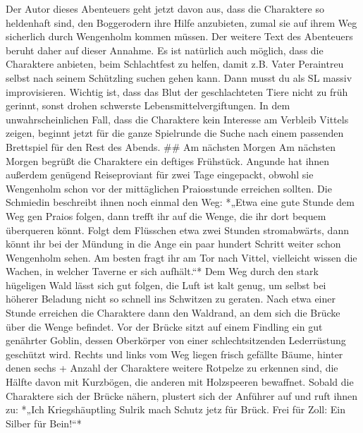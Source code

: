 Der Autor dieses Abenteuers geht jetzt davon aus, dass die Charaktere so heldenhaft sind, den Boggerodern ihre Hilfe anzubieten, zumal sie auf ihrem Weg sicherlich durch Wengenholm kommen müssen. Der weitere Text des Abenteuers beruht daher auf dieser Annahme. Es ist natürlich auch möglich, dass die Charaktere anbieten, beim Schlachtfest zu helfen, damit z.B. Vater Peraintreu selbst nach seinem Schützling suchen gehen kann. Dann musst du als SL massiv improvisieren. Wichtig ist, dass das Blut der geschlachteten Tiere nicht zu früh gerinnt, sonst drohen schwerste Lebensmittelvergiftungen.
In dem unwahrscheinlichen Fall, dass die Charaktere kein Interesse am Verbleib Vittels zeigen, beginnt jetzt für die ganze Spielrunde die Suche nach einem passenden Brettspiel für den Rest des Abends. 
\platz
## Am nächsten Morgen
\platz
Am nächsten Morgen begrüßt die Charaktere ein deftiges Frühstück. Angunde hat ihnen außerdem genügend Reiseproviant für zwei Tage eingepackt, obwohl sie Wengenholm schon vor der mittäglichen Praiosstunde erreichen sollten. Die Schmiedin beschreibt ihnen noch einmal den Weg: *„Etwa eine gute Stunde dem Weg gen Praios folgen, dann trefft ihr auf die Wenge, die ihr dort bequem überqueren könnt. Folgt dem Flüsschen etwa zwei Stunden stromabwärts, dann könnt ihr bei der Mündung in die Ange ein paar hundert Schritt weiter schon Wengenholm sehen. Am besten fragt ihr am Tor nach Vittel, vielleicht wissen die Wachen, in welcher Taverne er sich aufhält.“*
\platz
Dem Weg durch den stark hügeligen Wald lässt sich gut folgen, die Luft ist kalt genug, um selbst bei höherer Beladung nicht so schnell ins Schwitzen zu geraten. Nach etwa einer Stunde erreichen die Charaktere dann den Waldrand, an dem sich die Brücke über die Wenge befindet. Vor der Brücke sitzt auf einem Findling ein gut genährter Goblin, dessen Oberkörper von einer schlechtsitzenden Lederrüstung geschützt wird. Rechts und links vom Weg liegen frisch gefällte Bäume, hinter denen sechs + Anzahl der Charaktere weitere Rotpelze zu erkennen sind, die Hälfte davon mit Kurzbögen, die anderen mit Holzspeeren bewaffnet. Sobald die Charaktere sich der Brücke nähern, plustert sich der Anführer auf und ruft ihnen zu: *„Ich Kriegshäuptling Sulrik mach Schutz jetz für Brück. Frei für Zoll: Ein Silber für Bein!“*

